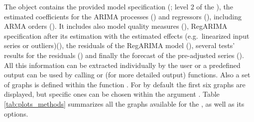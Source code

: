 \documentclass[article]{jss}
\begin{document}
The  object contains the provided model specification
(; level 2 of the ), the estimated
coefficients for the ARIMA processes () and
regressors (), including ARMA orders
(). It includes also model quality measures (),
RegARIMA specification after its estimation with the estimated effects
(e.g.~linearized input series or outliers)(), the residuals
of the RegARIMA model (), several tests' results for the
residuals () and finally the forecast of the
pre-adjusted series (). All this information can be
extracted individually by the user or a predefined output can be used by
calling  or  (for more detailed output)
functions. Also a set of graphs is defined within the function
. For  by default the first six graphs are
displayed, but specific ones can be chosen within the argument
. Table \ref{tab:plots_methods} summarizes all the graphs
available for the , as well as its 
options.
\end{document}
